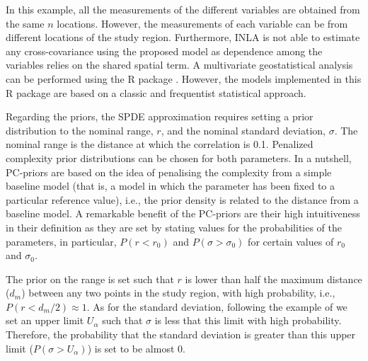 \medskip
In this example, all the measurements of the different variables are obtained from the same $n$ locations. However, the measurements of each variable can be from  different locations of the study region. Furthermore, INLA is not able to estimate any cross-covariance using the proposed model as dependence among the variables relies on the shared spatial term. A multivariate geostatistical analysis can be performed using the R package . However, the models implemented in this R package are based on a classic and frequentist  statistical approach.
 


\medskip
Regarding the priors, the SPDE approximation requires setting a prior distribution to the nominal range, $r$, and the nominal standard deviation, $\sigma$. The nominal range is the distance at which the correlation is 0.1. Penalized complexity prior distributions \citep[PC-priors, ][]{PCpriors} can be chosen for both parameters. In a nutshell, PC-priors are based on the idea of penalising the complexity from a simple baseline model (that is, a model in which the parameter has been fixed to a particular reference value), i.e., the prior density is related to the distance from a baseline model. A remarkable benefit of the PC-priors are their high intuitiveness in their definition as they are set by stating values for the probabilities of the parameters, in particular, $P(r < r_0)$ and $P(\sigma > \sigma_0)$ for certain values of $r_0$ and $\sigma_0$.

\medskip
The prior on the range is set such that $r$ is lower than half the maximum distance ($d_m$) between any two points in the study region, with high probability, i.e., $P(r < d_m / 2) \approx 1$. As for the standard deviation, following the example of \citet{Simpson2019Careful} we set an upper  limit $U_\alpha$ such that $\sigma$ is less that this limit with high probability. Therefore, the probability that the standard deviation is greater than this upper limit ($ P(\sigma > U_{\alpha})$) is set to be almost 0.







